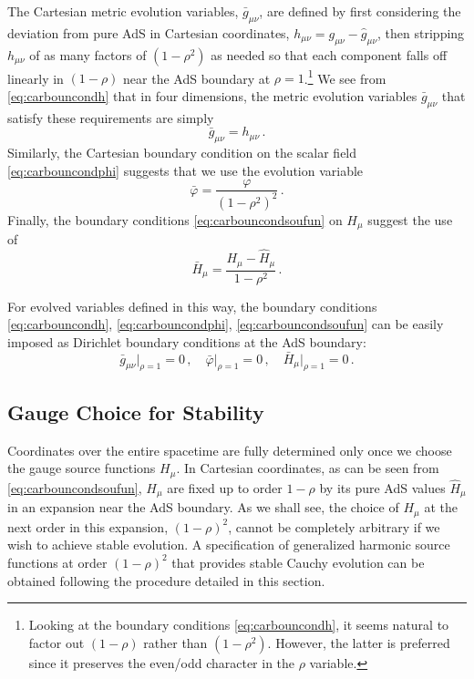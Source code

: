 \documentclass[aps,letterpaper,twocolumn,nofootinbib]{revtex4}
\numberwithin{equation}{section}
\begin{document}
The Cartesian metric evolution variables, $\bar{g}_{\mu\nu}$, are defined by first considering the deviation from pure AdS in Cartesian coordinates, $h_{\mu\nu}=g_{\mu\nu}-\hat{g}_{\mu\nu}$, then stripping $h_{\mu\nu}$ of as many factors of $(1-\rho^2)$ as needed so that each component falls off linearly in $(1-\rho)$ near the AdS boundary at $\rho=1$.\footnote{Looking at the boundary conditions \eqref{eq:carbouncondh}, it seems natural to factor out $(1-\rho)$ rather than $(1-\rho^2)$. However, the latter is preferred since it preserves the even/odd character in the $\rho$ variable.}
We see from \eqref{eq:carbouncondh} that in four dimensions, the metric evolution variables $\bar{g}_{\mu\nu}$ that satisfy these requirements are simply 
\begin{equation}\label{eq:gbarcart}
\bar{g}_{\mu\nu}=h_{\mu\nu}\,.
\end{equation}
Similarly, the Cartesian boundary condition on the scalar field \eqref{eq:carbouncondphi} suggests that we use the evolution variable
\begin{equation}
\label{eq:phibarcart}
\bar{\varphi}=\frac{\varphi }{(1-\rho^2)^2}\,.
\end{equation}
Finally, the boundary conditions \eqref{eq:carbouncondsoufun} on $H_\mu$ suggest the use of
\begin{equation}\label{eq:soufunb}
\bar{H}_\mu=\frac{H_\mu-\hat{H}_\mu}{1-\rho^2 }\,.
\end{equation}

For evolved variables defined in this way, the boundary conditions \eqref{eq:carbouncondh}, \eqref{eq:carbouncondphi}, \eqref{eq:carbouncondsoufun} can be easily imposed as Dirichlet boundary conditions at the AdS boundary:
\begin{equation}
\label{eq:dirbc}
 \bar{g}_{\mu\nu}\big|_{\rho=1}=0\,,\quad \bar{\varphi}\big|_{\rho=1}=0\,,\quad \bar{H}_\mu\big|_{\rho=1}=0\,.
 \end{equation}



\subsection{Gauge Choice for Stability}\label{sec:gauge_choice}

Coordinates over the entire spacetime are fully determined only once we choose the gauge source functions $H_\mu$. 
In Cartesian coordinates, as can be seen from \eqref{eq:carbouncondsoufun}, $H_\mu$ are fixed up to order $1-\rho$ by its pure AdS values $\hat{H}_\mu$ in an expansion near the AdS boundary.
As we shall see, the choice of $H_\mu$ at the next order in this expansion, $(1-\rho)^2$, cannot be completely arbitrary if we wish to achieve stable evolution.
A specification of generalized harmonic source functions at order $(1-\rho)^2$ that provides stable Cauchy evolution can be obtained following the procedure detailed in this section.
\end{document}

